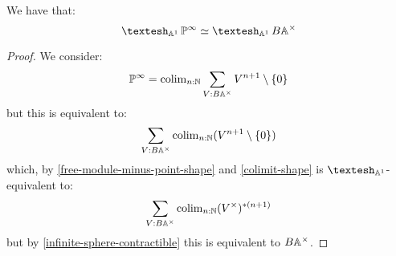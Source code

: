 \begin{proposition}
We have that:
\[\shape_{\A^1} \bP^\infty \simeq \shape_{\A^1} B\A^\times\]
\end{proposition}

\begin{proof}
We consider:
\[\mathbb{P}^\infty = \mathrm{colim}_{n:\mathbb{N}} \sum_{V:B\mathbb{A}^\times} V^{n+1}\setminus\{0\}\]
but this is equivalent to:
\[ \sum_{V:B\mathbb{A}^\times}\mathrm{colim}_{n:\mathbb{N}} (V^{n+1}\setminus\{0\}) \]
which, by \cref{free-module-minus-point-shape} and \cref{colimit-shape} is $\shape_{\A^1}$-equivalent to:
\[ \sum_{V:B\mathbb{A}^\times}\mathrm{colim}_{n:\mathbb{N}} (V^\times)^{*(n+1)}\]
but by \cref{infinite-sphere-contractible} this is equivalent to $B\mathbb{A}^\times$.
\end{proof}